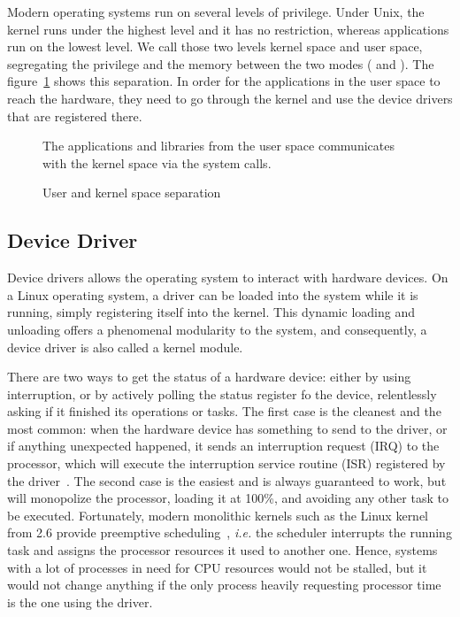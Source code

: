 

Modern operating systems run on several levels of privilege.
Under Unix, the kernel runs under the highest level and it has no restriction, whereas applications run on the lowest level.
We call those two levels kernel space and user space, segregating the privilege and the memory between the two modes (\citet{tanenbaum2014} and \citet[chap. 2]{Corbet:2005:LDD:1209083}).
The figure~\ref{fig:user-kernel} shows this separation.
In order for the applications in the user space to reach the hardware, they need to go through the kernel and use the device drivers that are registered there.

\begin{figure}[ht]
\center

\caption{User and kernel space separation}{The applications and libraries from the user space communicates with the kernel space via the system calls.}
\label{fig:user-kernel}
\end{figure}

\subsection{Device Driver}\label{sec:theory-driver}
Device drivers allows the operating system to interact with hardware devices.
On a Linux operating system, a driver can be loaded into the system while it is running, simply registering itself into the kernel.
This dynamic loading and unloading offers a phenomenal modularity to the system, and consequently, a device driver is also called a kernel module.\newline{}

There are two ways to get the status of a hardware device: either by using interruption, or by actively polling the status register fo the device, relentlessly asking if it finished its operations or tasks.
The first case is the cleanest and the most common: when the hardware device has something to send to the driver, or if anything unexpected happened, it sends an interruption request (IRQ) to the processor, which will execute the interruption service routine (ISR) registered by the driver~\citep[chap. 10]{Corbet:2005:LDD:1209083}.
The second case is the easiest and is always guaranteed to work, but will monopolize the processor, loading it at 100\%, and avoiding any other task to be executed.
Fortunately, modern monolithic kernels such as the Linux kernel from 2.6 provide preemptive scheduling~\cite{Santhanam2003}, \textit{i.e.} the scheduler interrupts the running task and assigns the processor resources it used to another one.
Hence, systems with a lot of processes in need for CPU resources would not be stalled, but it would not change anything if the only process heavily requesting processor time is the one using the driver.\newline{}

